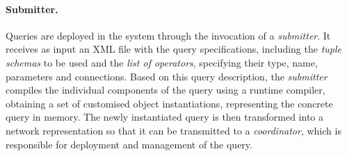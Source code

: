 \paragraph*{Submitter.} Queries are deployed in the system through the invocation of a
\emph{submitter}.  It receives as input an XML file with the query specifications, including the
\emph{tuple schemas} to be used and the \emph{list of operators}, specifying their type, name, parameters
and connections.
Based on this query description, the \emph{submitter} compiles the individual components of the
query using a runtime compiler, obtaining a set of customised object instantiations, representing the
concrete query in memory. The newly instantiated query is then transformed into a network representation
so that it can be transmitted to a \emph{coordinator}, which is responsible for deployment and
management of the query.

% 
\vspace{-10pt}
